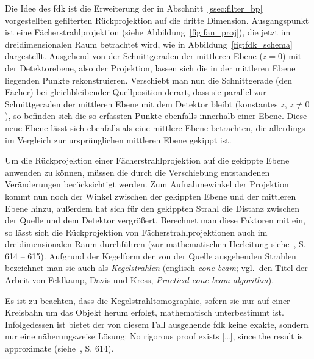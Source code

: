 Die Idee des \gls{fdk} ist die Erweiterung der in Abschnitt~\ref{ssec:filter_bp} vorgestellten gefilterten
Rückprojektion auf die dritte Dimension. Ausgangspunkt ist eine Fächerstrahlprojektion (siehe
Abbildung~\ref{fig:fan_proj}), die jetzt im dreidimensionalen Raum betrachtet wird, wie in
Abbildung~\ref{fig:fdk_schema} dargestellt. Ausgehend von der Schnittgeraden der mittleren Ebene ($z = 0$) mit der
Detektorebene, also der Projektion, lassen sich die in der mittleren Ebene liegenden Punkte rekonstruieren. Verschiebt
man nun die Schnittgerade (den Fächer) bei gleichbleibender Quellposition derart, dass sie parallel zur Schnittgeraden
der mittleren Ebene mit dem Detektor bleibt (konstantes $z$, $z \neq 0$), so befinden sich die so erfassten Punkte
ebenfalls innerhalb einer Ebene. Diese neue Ebene lässt sich ebenfalls als eine mittlere Ebene betrachten, die
allerdings im Vergleich zur {\glqq}ursprünglichen{\grqq} mittleren Ebene gekippt ist.

Um die Rückprojektion einer Fächerstrahlprojektion auf die gekippte Ebene anwenden zu können, müssen die durch die
Verschiebung entstandenen Veränderungen berücksichtigt werden. Zum Aufnahmewinkel der Projektion kommt nun noch der
Winkel zwischen der gekippten Ebene und der mittleren Ebene hinzu, außerdem hat sich für den gekippten Strahl die
Distanz zwischen der Quelle und dem Detektor vergrößert. Berechnet man diese Faktoren mit ein, so lässt sich die
Rückprojektion von Fächerstrahlprojektionen auch im dreidimensionalen Raum durchführen (zur mathematischen Herleitung
siehe~\cite{fdk}, S. 614 -- 615). Aufgrund der Kegelform der von der Quelle ausgehenden Strahlen bezeichnet man sie auch
als \textit{Kegelstrahlen} (englisch \textit{cone-beam}; vgl.\ den Titel der Arbeit von Feldkamp, Davis und Kress,
\textit{Practical cone-beam algorithm}).

Es ist zu beachten, dass die Kegelstrahltomographie, sofern sie nur auf einer Kreisbahn um das Objekt herum erfolgt,
mathematisch unterbestimmt ist. Infolgedessen ist bietet der von diesem Fall ausgehende \gls{fdk} keine exakte, sondern
nur eine näherungsweise Lösung: {\glqq}No rigorous proof exists [\ldots], since the result is approximate{\grqq}
(siehe~\cite{fdk}, S. 614).


